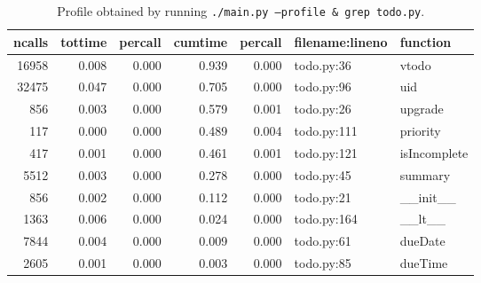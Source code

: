 \documentclass{prettytex/ox/mmsc-special-topic}
\begin{document}
  \begin{table}[H]
    \centering
    \caption{Profile obtained by running \texttt{./main.py --profile & grep todo.py}.}
    \begin{tabular}{rrrrrll}
      \hline
      ncalls & tottime & percall & cumtime & percall & filename:lineno & function     \\
      \hline
      16958  & 0.008   & 0.000   & 0.939   & 0.000   & todo.py:36      & vtodo        \\
      32475  & 0.047   & 0.000   & 0.705   & 0.000   & todo.py:96      & uid          \\
      856    & 0.003   & 0.000   & 0.579   & 0.001   & todo.py:26      & upgrade      \\
      117    & 0.000   & 0.000   & 0.489   & 0.004   & todo.py:111     & priority     \\
      417    & 0.001   & 0.000   & 0.461   & 0.001   & todo.py:121     & isIncomplete \\
      5512   & 0.003   & 0.000   & 0.278   & 0.000   & todo.py:45      & summary      \\
      856    & 0.002   & 0.000   & 0.112   & 0.000   & todo.py:21      & \_\_init\_\_ \\
      1363   & 0.006   & 0.000   & 0.024   & 0.000   & todo.py:164     & \_\_lt\_\_   \\
      7844   & 0.004   & 0.000   & 0.009   & 0.000   & todo.py:61      & dueDate      \\
      2605   & 0.001   & 0.000   & 0.003   & 0.000   & todo.py:85      & dueTime      \\
    \end{tabular}
  \end{table}
\end{document}
